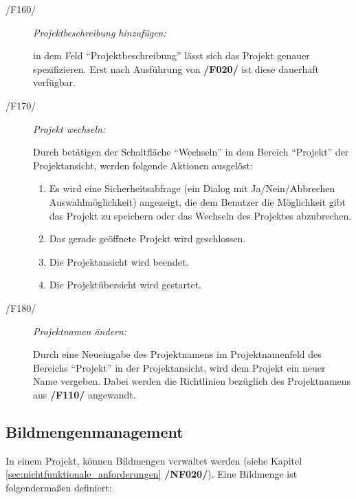 \begin{description}
\begin{enumerate}
			\end{enumerate}
	
		\item[/F160/] \textit{Projektbeschreibung hinzufügen:}\par in dem Feld "`Projektbeschreibung"' lässt sich das Projekt genauer spezifizieren. Erst nach Ausführung von \textbf{/F020/} ist diese dauerhaft verfügbar.
	
		\item[/F170/] \textit{Projekt wechseln:}\par Durch betätigen der Schaltfläche "`Wechseln"' in dem Bereich "`Projekt"' der Projektansicht, werden folgende Aktionen ausgelöst:
		
		\begin{enumerate}
				
				\item Es wird eine Sicherheitsabfrage (ein Dialog mit Ja/Nein/Abbrechen Auswahlmöglichkeit) angezeigt, die dem Benutzer die Möglichkeit gibt das Projekt zu speichern oder das Wechseln des Projektes abzubrechen.
				
				\item Das gerade geöffnete Projekt wird geschlossen.
				
				\item Die Projektansicht wird beendet.
				
				\item Die Projektübersicht wird gestartet.
			
			\end{enumerate}

		\item[/F180/] \textit{Projektnamen ändern:}\par Durch eine Neueingabe des Projektnamens im Projektnamenfeld des Bereichs "`Projekt"' in der Projektansicht, wird dem Projekt ein neuer Name vergeben. Dabei werden die Richtlinien bezüglich des Projektnamens aus \textbf{/F110/} angewandt.
	
	\end{description}

\subsection{Bildmengenmanagement}

\label{subsec:bildmengenmgmt}
	
	In einem Projekt, können Bildmengen verwaltet werden (siehe Kapitel \ref{sec:nichtfunktionale_anforderungen} \textbf{/NF020/}). Eine Bildmenge ist folgendermaßen definiert:
	

